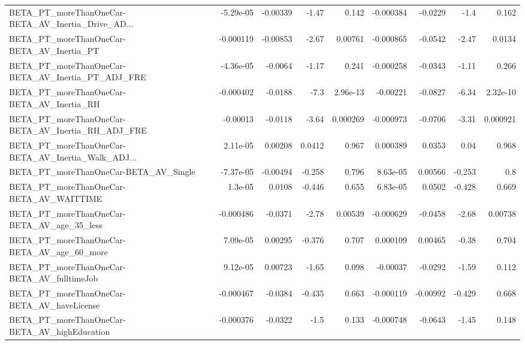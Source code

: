 \begin{tabular}{lrrrrrrrr}
BETA\_PT\_moreThanOneCar-BETA\_AV\_Inertia\_Drive\_AD... &   -5.29e-05 &     -0.00339 &    -1.47 &    0.142 &  -0.000384 &     -0.0229 &         -1.4 &         0.162 \\
BETA\_PT\_moreThanOneCar-BETA\_AV\_Inertia\_PT          &   -0.000119 &     -0.00853 &    -2.67 &  0.00761 &  -0.000865 &     -0.0542 &        -2.47 &        0.0134 \\
BETA\_PT\_moreThanOneCar-BETA\_AV\_Inertia\_PT\_ADJ\_FRE  &   -4.36e-05 &      -0.0064 &    -1.17 &    0.241 &  -0.000258 &     -0.0343 &        -1.11 &         0.266 \\
BETA\_PT\_moreThanOneCar-BETA\_AV\_Inertia\_RH          &   -0.000402 &      -0.0188 &     -7.3 & 2.96e-13 &   -0.00221 &     -0.0827 &        -6.34 &      2.32e-10 \\
BETA\_PT\_moreThanOneCar-BETA\_AV\_Inertia\_RH\_ADJ\_FRE  &    -0.00013 &      -0.0118 &    -3.64 & 0.000269 &  -0.000973 &     -0.0706 &        -3.31 &      0.000921 \\
BETA\_PT\_moreThanOneCar-BETA\_AV\_Inertia\_Walk\_ADJ... &    2.11e-05 &      0.00208 &   0.0412 &    0.967 &   0.000389 &      0.0353 &         0.04 &         0.968 \\
BETA\_PT\_moreThanOneCar-BETA\_AV\_Single              &   -7.37e-05 &     -0.00494 &   -0.258 &    0.796 &   8.63e-05 &     0.00566 &       -0.253 &           0.8 \\
BETA\_PT\_moreThanOneCar-BETA\_AV\_WAITTIME            &     1.3e-05 &       0.0108 &   -0.446 &    0.655 &   6.83e-05 &      0.0502 &       -0.428 &         0.669 \\
BETA\_PT\_moreThanOneCar-BETA\_AV\_age\_35\_less         &   -0.000486 &      -0.0371 &    -2.78 &  0.00539 &  -0.000629 &     -0.0458 &        -2.68 &       0.00738 \\
BETA\_PT\_moreThanOneCar-BETA\_AV\_age\_60\_more         &    7.09e-05 &      0.00295 &   -0.376 &    0.707 &   0.000109 &     0.00465 &        -0.38 &         0.704 \\
BETA\_PT\_moreThanOneCar-BETA\_AV\_fulltimeJob         &    9.12e-05 &      0.00723 &    -1.65 &    0.098 &   -0.00037 &     -0.0292 &        -1.59 &         0.112 \\
BETA\_PT\_moreThanOneCar-BETA\_AV\_haveLicense         &   -0.000467 &      -0.0384 &   -0.435 &    0.663 &  -0.000119 &    -0.00992 &       -0.429 &         0.668 \\
BETA\_PT\_moreThanOneCar-BETA\_AV\_highEducation       &   -0.000376 &      -0.0322 &     -1.5 &    0.133 &  -0.000748 &     -0.0643 &        -1.45 &         0.148 \\

\end{tabular}
